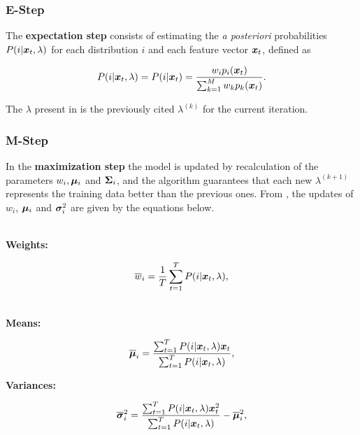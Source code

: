 \subsubsection*{E-Step}

The \textbf{expectation step} consists of estimating the \emph{a posteriori} probabilities $P(i|\boldsymbol{x}_t, \lambda)$ for each distribution $i$ and each feature vector $\boldsymbol{x}_t$, defined as

\begin{equation}
    \postprob{i}{\dvec{x}_t, \lambda} = \postprob{i}{\dvec{x}_t} = \frac{w_i p_i(\dvec{x}_t)}{\sum_{k=1}^M w_k p_k(\dvec{x}_t)}.
    \label{eq:e-step-posterior}
\end{equation}

\noindent The $\lambda$ present in  is the previously cited $\lambda^{(k)}$ for the current iteration.

\subsubsection*{M-Step}

In the \textbf{maximization step} the model is updated by recalculation of the parameters $w_i, \boldsymbol{\mu}_i$ and $\boldsymbol{\Sigma}_i$, and the algorithm guarantees that each new $\lambda^{(k+1)}$ represents the training data better than the previous ones. From , the updates of $w_i$, $\boldsymbol{\mu}_i$ and $\boldsymbol{\sigma}_i^2$ are given by the equations below.

\noindent\\\textbf{Weights:}

\begin{equation}
    \overline{w}_i = \frac{1}{T} \sum_{t=1}^T \postprob{i}{\dvec{x}_t, \lambda},
    \label{eq:m-step-weight}
\end{equation}

\noindent\\\textbf{Means:}

\begin{equation}
    \overline{\dvec{\mu}}_i = \frac{\sum_{t=1}^T \postprob{i}{\dvec{x}_t, \lambda} \dvec{x}_t}{\sum_{t=1}^T \postprob{i}{\dvec{x}_t, \lambda}},
    \label{eq:m-step-means}
\end{equation}

\noindent\textbf{Variances:}

\begin{equation}
    \overline{\dvec{\sigma}}_i^2 = \frac{\sum_{t=1}^T \postprob{i}{\dvec{x}_t, \lambda} \dvec{x}_t^2}{\sum_{t=1}^T \postprob{i}{\dvec{x}_t, \lambda}} - \overline{\dvec{\mu}}_i^2,
    \label{eq:m-step-variances}
\end{equation}

